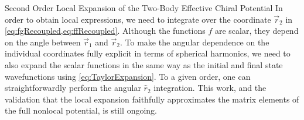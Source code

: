 \begin{section}{Second Order Local Expansion of the Two-Body Effective Chiral Potential\label{sec:localChiral}}
In order to obtain local expressions, we need to integrate over the coordinate $\vec{r}_2$ in \cref{eq:fgRecoupled,eq:ffRecoupled}. Although the functions $f$ are scalar, they depend on the angle between $\vec{r}_1$ and $\vec{r}_2$. To make the angular dependence on the individual coordinates fully explicit in terms of spherical harmonics, we need to also expand the scalar functions in the same way as the initial and final state wavefunctions using \eqref{eq:TaylorExpansion}. To a given order, one can straightforwardly perform the angular $\hat{r}_2$ integration. This work, and the validation that the local expansion faithfully approximates the matrix elements of the full nonlocal potential, is still ongoing.

\end{section}